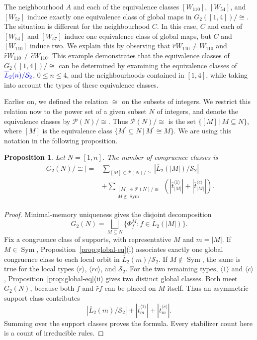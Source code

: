 \documentclass[11pt,a4paper]{article}
\newcommand{\rev}[1]{{\color{blue}#1}}
\newenvironment{revision}{\color{blue}}{}
\newcommand{\rev}[1]{{\color{black}#1}}
\newenvironment{revision}{\color{black}}{}
\newcommand{\locmark}[1]{\label{#1}\linelabel{line:#1}}
\newcommand{\Sym}{\mathop{\mathrm{Sym}}}
\newtheorem{prop}{Proposition}
\begin{document}
The neighbourhood $A$ and each of the equivalence classes $[W_{110}]$, $[W_{54}]$, and $[W_{57}]$
induce exactly one equivalence class of global maps in $G_2([1,4])/{\cong}$.
The situation is different for the neighbourhood $C$.
In this case, $C$ and each of $[W_{54}]$ and $[W_{57}]$ induce one equivalence class of global maps,
but $C$ and $[W_{110}]$ induce two.
We explain this by observing that $\hat{r}W_{110} \ne W_{110}$ and
$\hat{r}W_{110} \ne \hat{c}W_{110}$.
This example demonstrates that the equivalence classes of $G_2([1,4])/{\cong}$ can be determined by examining
the equivalence classes of $\rev{\overline{L}_2(n)/\mathcal{S}_2}$, $0 \le n \le 4$, and the neighbourhoods contained
in $[1,4]$, while taking into account the types of these equivalence classes.

Earlier on, we defined the relation $\cong$ on the subsets of integers.
We restrict this relation now to the power set of a given subset $N$ of integers, and denote the equivalence
classes by $\mathcal{P}(N)/{\cong}$.
Thus $\mathcal{P}(N)/{\cong}$ is the set $ \{ [M] \, | \, M \subseteq N \}$, where $[M]$ is the equivalence
class $\{ M^\prime \subseteq N \, | \, M^\prime \cong M \}$.
We are using this notation in the following proposition.
\begin{revision}
\begin{prop}\label{prop:global-shift}\locmark{loc:congruence-count}
Let $N=[1,n]$. The number of congruence classes is
\begin{equation}\label{eq:congruence-count}
\begin{split}
|G_2(N)/{\cong}|={}&
\sum_{[M]\in\mathcal P(N)/{\cong}}
  |\overline L_2(|M|)/\mathcal S_2|\\
&+\sum_{\substack{[M]\in\mathcal P(N)/{\cong}\\ M\notin\Sym}}
 \left(|\overline t_{|M|}^{\langle1\rangle}|
       +|\overline t_{|M|}^{\langle c\rangle}|\right).
\end{split}
\end{equation}
\end{prop}
\begin{proof}
Minimal-memory uniqueness gives the disjoint decomposition
\[
G_2(N)=\bigsqcup_{M\subseteq N}
       \{\Phi_f^M:f\in\overline L_2(|M|)\}.
\]
Fix a congruence class of supports, with representative $M$ and $m=|M|$.
If $M\in\Sym$, Proposition~\ref{prop:global-eq}(i) associates exactly
one global congruence class to each local orbit in
$\overline L_2(m)/\mathcal S_2$.
If $M\notin\Sym$, the same is true for the local types
$\langle r\rangle$, $\langle rc\rangle$, and $\mathcal S_2$.
For the two remaining types, $\langle1\rangle$ and
$\langle c\rangle$, Proposition~\ref{prop:global-eq}(ii) gives two
distinct global classes. Both meet $G_2(N)$, because both $f$ and
$\hat r f$ can be placed on $M$ itself. Thus an asymmetric support
class contributes
\[
|\overline L_2(m)/\mathcal S_2|
+|\overline t_m^{\langle1\rangle}|
+|\overline t_m^{\langle c\rangle}|.
\]
Summing over the support classes proves the formula. Every stabilizer
count here is a count of irreducible rules.
\end{proof}
\end{revision}
\end{document}
